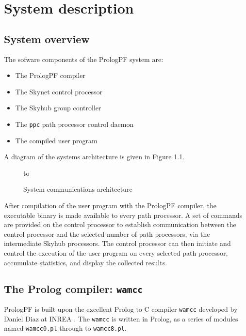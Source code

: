 \chapter{System description}
\label{system}

\section{System overview} %

The sofware components of the PrologPF system are:
\begin{itemize}
\item{The PrologPF compiler}
\item{The Skynet control processor}
\item{The Skyhub group controller}
\item{The \texttt{ppc} path processor control daemon}
\item{The compiled user program}
\end{itemize}

A diagram of the systems architecture is given in Figure \ref{system_diag}.

\begin{figure}[htbp]
\vspace{5mm} \hbox to 
\caption{System communications architecture}
\vspace{5mm}
\label{system_diag}
\end{figure}

After compilation of the user program with the PrologPF compiler, the
executable binary is made available to every path processor.  A set of
commands are provided on the control processor to establish communication
between the control processor and the selected number of path processors,
via the intermediate Skyhub processors.  The control processor can then
initiate and control the execution of the user program on every selected
path processor, accumulate statistics, and display the collected results.

\section{The Prolog compiler: \texttt{wamcc}} %

PrologPF is built upon the excellent Prolog to C compiler \texttt{wamcc}
developed by Daniel Diaz at INREA \cite{CD95}.  The \texttt{wamcc} is written
in Prolog, as a series of modules named \texttt{wamcc0.pl} through to
\texttt{wamcc8.pl}.

